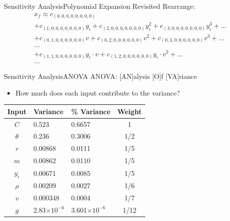 \documentclass{beamer}
\begin{document}
\begin{frame}{Sensitivity Analysis}{Polynomial Expansion Revisited}\vspace{-30pt}
Rearrange:
\begin{align*}
&x_f \approx c_{(0,0,0,0,0,0,0,0)} \\
 &+c_{(1,0,0,0,0,0,0,0)}y_i + c_{(2,0,0,0,0,0,0,0)}y_i^2 + c_{(3,0,0,0,0,0,0,0)}y_i^3+\ldots\\
 &+c_{(0,1,0,0,0,0,0,0)}v + c_{(0,2,0,0,0,0,0,0)}v^2 + c_{(0,3,0,0,0,0,0,0)}v^3+\ldots\\
 &\ldots\\
 &+c_{(1,1,0,0,0,0,0,0)}y_i\cdot v + c_{(1,2,0,0,0,0,0,0)}y_i\cdot v^2+\ldots\\
 &\ldots
\end{align*}
\end{frame}

\begin{frame}[label=sens_res]{Sensitivity Analysis}{ANOVA}
ANOVA: [AN]alysis [O]f [VA]riance
\begin{itemize}
\item How much does each input contribute to the variance?
\end{itemize}
\begin{table}
\centering
  \begin{tabular}{c|l|l|c}
    Input & Variance & \% Variance & Weight\\ \hline
    $C$ & 0.523 & 0.6657 & 1\\
    $\theta$ & 0.236 & 0.3006 & 1/2\\
    $r$ & 0.00868 & 0.0111 & 1/5\\
    $m$ & 0.00862 & 0.0110 & 1/5\\
    $y_i$ & 0.00671 & 0.0085 & 1/5\\
    $\rho$ & 0.00209 & 0.0027 & 1/6\\
    $v$ & 0.000348 & 0.0004 & 1/7\\
    $g$ & 2.83$\times10^{-6}$ & 3.601$\times10^{-6}$ & 1/12
  \end{tabular}
\end{table}
\begin{center}\hyperlink{unc_sum}{}\end{center}
\end{frame}
\end{document}
